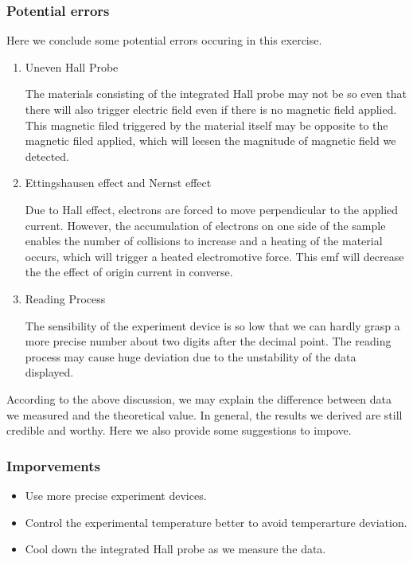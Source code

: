 \documentclass[a4paper]{article}
\begin{document}
\subsubsection{Potential errors}
\par Here we conclude some potential errors occuring in this exercise.
\begin{enumerate}[1.]
	\item Uneven Hall Probe \\
		\par The materials consisting of the integrated Hall probe may not be so even that there will also trigger
		electric field even if there is no magnetic field applied. This magnetic filed triggered by the material itself
		may be opposite to the magnetic filed applied, which will leesen the magnitude of magnetic field we detected.
	\item Ettingshausen effect and Nernst effect \\ 
		\par Due to Hall effect, electrons are forced to move perpendicular to the applied current. However, 
			the accumulation of electrons on one side of the sample enables the number of collisions to increase and a 
			heating of the material occurs, which will trigger a heated electromotive force. This emf will decrease the the
			effect of origin current in converse.
	\item Reading Process \\ 
		\par The sensibility of the experiment device is so low that we can hardly grasp a more precise number about two digits
		after the decimal point. The reading process may cause huge deviation due to the unstability of the data displayed.
\end{enumerate}

According to the above discussion, we may explain the difference between data we measured and the theoretical value.
In general, the results we derived are still credible and worthy. Here we also provide some suggestions to impove.

\subsubsection{Imporvements}
\begin{itemize}
	\item Use more precise experiment devices.
	\item Control the experimental temperature better to avoid temperarture deviation.
	\item Cool down the integrated Hall probe as we measure the data.
\end{itemize}
\end{document}
